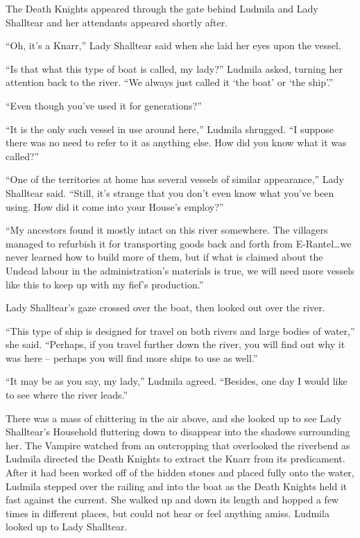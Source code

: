  

The Death Knights appeared through the gate behind Ludmila and Lady Shalltear and her attendants appeared shortly after.

 

“Oh, it’s a Knarr,” Lady Shalltear said when she laid her eyes upon the vessel.

 

“Is that what this type of boat is called, my lady?” Ludmila asked, turning her attention back to the river. “We always just called it ‘the boat’ or ‘the ship’.”

 

“Even though you’ve used it for generations?”

 

“It is the only such vessel in use around here,” Ludmila shrugged. “I suppose there was no need to refer to it as anything else. How did you know what it was called?”

 

“One of the territories at home has several vessels of similar appearance,” Lady Shalltear said. “Still, it’s strange that you don’t even know what you’ve been using. How did it come into your House’s employ?”

 

“My ancestors found it mostly intact on this river somewhere. The villagers managed to refurbish it for transporting goods back and forth from E-Rantel…we never learned how to build more of them, but if what is claimed about the Undead labour in the administration’s materials is true, we will need more vessels like this to keep up with my fief’s production.”

 

Lady Shalltear’s gaze crossed over the boat, then looked out over the river.

 

“This type of ship is designed for travel on both rivers and large bodies of water,” she said. “Perhaps, if you travel further down the river, you will find out why it was here – perhaps you will find more ships to use as well.”

 

“It may be as you say, my lady,” Ludmila agreed. “Besides, one day I would like to see where the river leads.”

 

There was a mass of chittering in the air above, and she looked up to see Lady Shalltear’s Household fluttering down to disappear into the shadows surrounding her. The Vampire watched from an outcropping that overlooked the riverbend as Ludmila directed the Death Knights to extract the Knarr from its predicament. After it had been worked off of the hidden stones and placed fully onto the water, Ludmila stepped over the railing and into the boat as the Death Knights held it fast against the current. She walked up and down its length and hopped a few times in different places, but could not hear or feel anything amiss. Ludmila looked up to Lady Shalltear.

